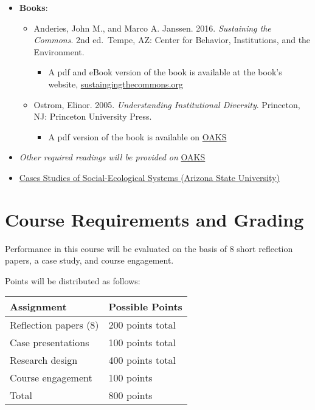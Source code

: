 \begin{itemize}
\item
  \textbf{Books}:

  \begin{itemize}
  
  \item
    Anderies, John M., and Marco A. Janssen. 2016. \emph{Sustaining the
    Commons}. 2nd ed.~Tempe, AZ: Center for Behavior, Institutions, and
    the Environment.

    \begin{itemize}
    
    \item
      A pdf and eBook version of the book is available at the book's
      website,
      \href{https://sustainingthecommons.org/}{sustaingingthecommons.org}
    \end{itemize}
  \item
    Ostrom, Elinor. 2005. \emph{Understanding Institutional Diversity}.
    Princeton, NJ: Princeton University Press.

    \begin{itemize}
    
    \item
      A pdf version of the book is available on
      \href{https://lms.cofc.edu}{OAKS}
    \end{itemize}
  \end{itemize}
\item
  \emph{Other required readings will be provided on}
  \href{https://lms.cofc.edu}{OAKS}
\item
  \href{https://seslibrary.asu.edu/case}{Cases Studies of
  Social-Ecological Systems (Arizona State University)}
\end{itemize}

\hypertarget{course-requirements-and-grading}{%
\section{Course Requirements and
Grading}\label{course-requirements-and-grading}}

Performance in this course will be evaluated on the basis of 8 short
reflection papers, a case study, and course engagement.

\vspace{0.10in}

\noindent Points will be distributed as follows:

\begin{center}
\begin{tabular}{ l l}
\hline
Assignment & Possible Points \\ 
\hline
Reflection papers (8) & 200 points total \\
Case presentations & 100 points total \\
Research design & 400 points total \\
Course engagement & 100 points \\
\hline
Total &  800 points \\
\hline
\end{tabular}
\end{center}

